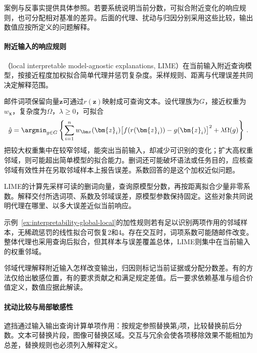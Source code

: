 案例与反事实提供具体参照。若要系统说明当前分数，可拟合附近变化的响应规则，也可分配相对基准的差异。后面的代理、扰动与归因分别采用这些比较，输出数值应按所定义的问题解释。

\paragraph{附近输入的响应规则}
\label{sec:interpretability-local-neighborhood}

（local interpretable model-agnostic explanations, LIME）在当前输入附近查询模型，按接近程度加权拟合简单代理并惩罚复杂度。采样规则、距离与代理误差共同决定解释范围。

邮件词项保留向量$\bm z$可通过$r(\bm z)$映射成可查询文本。设代理族为$G$，接近权重为$w_{\bm x}$，复杂度为$\Omega$，$\lambda\geq0$，可拟合
\begin{equation}
 \hat g=\argmin_{g\in G}\left\{
 \sum_{i=1}^{n}w_{\bm x}(\bm{z}_i)
 \bigl[f(r(\bm{z}_i))-g(\bm{z}_i)\bigr]^2
 +\lambda\Omega(g)\right\}\, .
 \label{eq:interpretability-lime}
\end{equation}
把较大权重集中在较窄邻域，能突出当前输入，却减少可识别的变化；扩大高权重邻域，则可能超出简单模型的拟合能力。删词还可能破坏语法或任务目的，应核查邻域有效性并在另取邻域样本上报告误差。系数回答的是这个加权近似问题。

LIME的计算先采样可读的删词向量，查询原模型分数，再按距离拟合少量非零系数。解释交付所选词项、系数及邻域误差，原模型参数保持固定。这些对象共同说明代理在哪里、以多大误差近似当前响应。

示例~\ref{ex:interpretability-global-local}的加性规则若有足以识别两项作用的邻域样本，无稀疏惩罚的线性拟合可恢复2和4。存在交互时，词项系数可能随邮件改变。整体代理也采用查询后拟合，但其样本与误差覆盖总体，LIME则集中在当前输入的权重邻域。

邻域代理解释附近输入怎样改变输出，归因则标记当前证据或分配分数差。有的方法仅给出敏感位置，有的要求贡献之和满足规定差值。后一要求依赖基准与组合价值定义，数值应据此解读。

\paragraph{扰动比较与局部敏感性}

遮挡通过输入输出查询计算单项作用：按规定参照替换第$j$项，比较替换前后分数。文本可替换片段，图像可替换区域。交互与冗余会使各项移除效果不能相加为总差，替换规则也必须列入解释定义。

